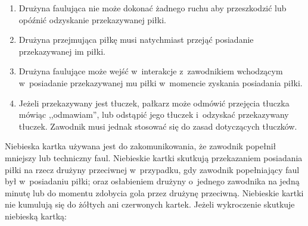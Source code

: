 \documentclass[12pt,a4paper]{article}
\renewcommand{\paragraph}[1]{
  \oldparagraph{#1}%
  \leftskip2cm
}
\begin{document}
\begin{enumerate}
	      \begin{enumerate}
		      \item
		            Drużyna faulująca nie może dokonać żadnego ruchu aby przeszkodzić
		            lub opóźnić odzyskanie przekazywanej piłki.
		      \item
		            Drużyna przejmująca piłkę musi natychmiast przejąć posiadanie
		            przekazywanej im piłki.
		      \item
		            Drużyna faulujące może wejść w~interakcje z~zawodnikiem wchodzącym w~posiadanie przekazywanej mu piłki w~momencie zyskania posiadania
		            piłki.
		      \item
		            Jeżeli przekazywany jest tłuczek, pałkarz może odmówić przejęcia
		            tłuczka mówiąc ,,odmawiam'', lub odstąpić jego tłuczek i~odzyskać
		            przekazywany tłuczek. Zawodnik musi jednak stosować się do zasad
		            dotyczących tłuczków.
	      \end{enumerate}
\end{enumerate}

\paragraph{Niebieska kartka}
Niebieska kartka używana jest do
zakomunikowania, że zawodnik popełnił mniejszy lub techniczny faul.
Niebieskie kartki skutkują przekazaniem posiadania piłki na rzecz
drużyny przeciwnej w~przypadku, gdy zawodnik popełniający faul był w~posiadaniu piłki; oraz osłabieniem drużyny o~jednego zawodnika na jedną
minutę lub do momentu zdobycia gola przez drużynę przeciwną. Niebieskie
kartki nie kumulują się do żółtych ani czerwonych kartek. Jeżeli
wykroczenie skutkuje niebieską kartką:
\end{document}
